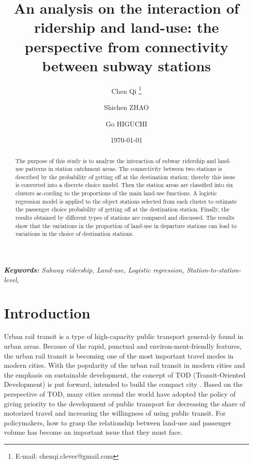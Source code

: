 \documentclass[utf8]{article}
\begin{document}
\title{An analysis on the interaction of ridership and land-use: the perspective from connectivity between subway stations}

\author{Chen Qi \thanks{E-mail: chenqi.clever@gmail.com} \and Shichen ZHAO \and Go HIGUCHI}
\date{\today}
\maketitle

%
\begin{abstract}
\noindent
The purpose of this study is to analyze the interaction of subway ridership and land-use patterns in station catchment areas. The connectivity between two stations is described by the probability of getting off at the destination station; thereby this issue is converted into a discrete choice model. Then the station areas are classified into six clusters ac-cording to the proportions of the main land-use functions. A logistic regression model is applied to the object stations selected from each cluster to estimate the passenger choice probability of getting off at the destination station. Finally, the results obtained by different types of stations are compared and discussed. The results show that the variations in the proportion of land-use in departure stations can lead to variations in the choice of destination stations.
\end{abstract}

%
\begin{center}
{\slshape \textbf{Keywords:} Subway ridership, Land-use, Logistic regression, Station-to-station-level, }
\end{center}

%
\section{Introduction}
\indent

%
Urban rail transit is a type of high-capacity public transport general-ly found in urban areas. Because of the rapid, punctual and environ-ment-friendly features, the urban rail transit is becoming one of the most important travel modes in modern cities. With the popularity of the urban rail transit in modern cities and the emphasis on sustainable development, the concept of TOD (Transit-Oriented Development) is put forward, intended to build the compact city \cite{Calthorpe1993}. Based on the perspective of TOD, many cities around the world have adopted the policy of giving priority to the development of public transport for decreasing the share of motorized travel and increasing the willingness of using public transit. For policymakers, how to grasp the relationship between land-use and passenger volume has become an important issue that they must face.
\end{document}
